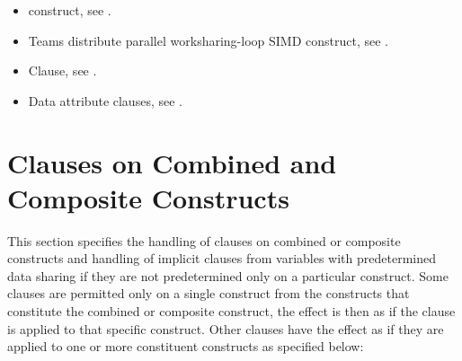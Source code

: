 \crossreferences
\begin{itemize}
\item {} construct, see .

\item Teams distribute parallel worksharing-loop SIMD construct, see
      .

\item {} Clause, see .

\item Data attribute clauses, see
      .
\end{itemize}

\section{Clauses on Combined and Composite Constructs}
\label{sec:Clauses on Combined and Composite Constructs}
This section specifies the handling of clauses on combined or composite constructs and handling of implicit clauses from
variables with predetermined data sharing if they are not predetermined only on a particular construct.
Some clauses are permitted only on a single construct from the constructs that
constitute the combined or composite construct, the effect is then as if the
clause is applied to that specific construct.  Other clauses have the effect as if
they are applied to one or more constituent constructs as specified below:

